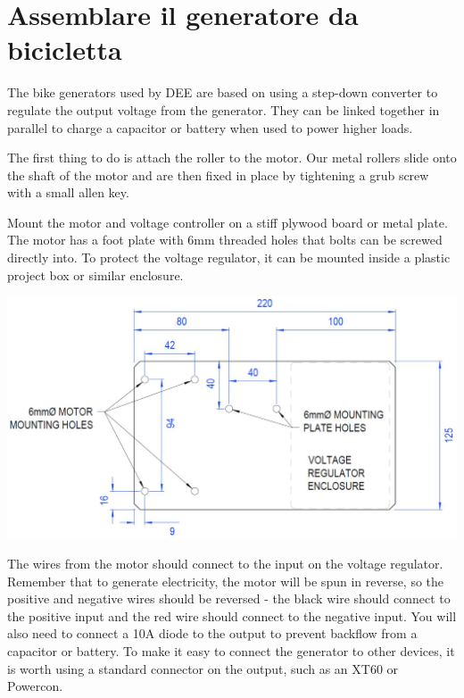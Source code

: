 \documentclass{article}
\theoremstyle{definition}
\theoremstyle{definition}
\theoremstyle{remark}
\begin{document}

{\color{blue}\section{Assemblare il generatore da bicicletta}} %
\label{sec:assembling_the_bike_generator}

  The bike generators used by DEE are based on using a step-down converter to regulate the output voltage from the generator. They can be linked together in parallel to charge a capacitor or battery when used to power higher loads.

  The first thing to do is attach the roller to the motor. Our metal rollers slide onto the shaft of the motor and are then fixed in place by tightening a grub screw with a small allen key. 

  Mount the motor and voltage controller on a stiff plywood board or metal plate. The motor has a foot plate with 6mm threaded holes that bolts can be screwed directly into. To protect the voltage regulator, it can be mounted inside a plastic project box or similar enclosure. 

  \begin{center}
    \includegraphics[width=0.75\paperwidth]{Images/image_4_1_(mounting_board).png}
  \end{center}

  The wires from the motor should connect to the input on the voltage regulator. Remember that to generate electricity, the motor will be spun in reverse, so the positive and negative wires should be reversed - the black wire should connect to the positive input and the red wire should connect to the negative input. You will also need to connect a 10A diode to the output to prevent backflow from a capacitor or battery. To make it easy to connect the generator to other devices, it is worth using a standard connector on the output, such as an XT60 or Powercon.
\end{document}
